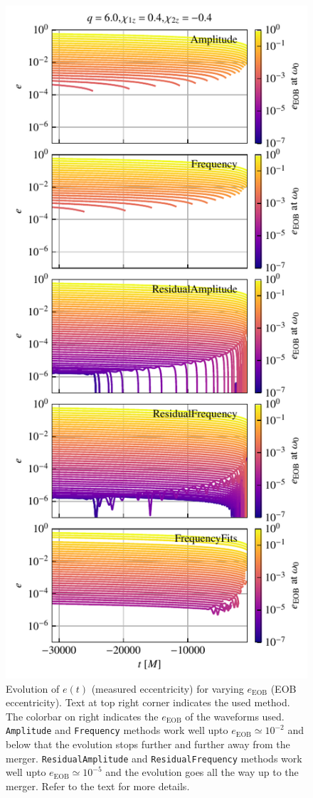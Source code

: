 \documentclass[aps,prd,amsmath,floats,floatfix, twocolumn,
superscriptaddress,nofootinbib,showpacs]{revtex4-1}
\newcommand{\eEOB}{e_{\text{EOB}}}
\newcommand{\mAmp}{\texttt{Amplitude}}
\newcommand{\mFreq}{\texttt{Frequency}}
\newcommand{\mResAmp}{\texttt{ResidualAmplitude}}
\newcommand{\mResFreq}{\texttt{ResidualFrequency}}
\begin{document}
\begin{figure}[thb]
\includegraphics[width=\columnwidth]{test_measured_ecc_vs_time_example}
\caption{
  Evolution of $e(t)$ (measured eccentricity) for varying $\eEOB$ (EOB
eccentricity). Text at top right corner indicates the used method. The
colorbar on right indicates the $\eEOB$ of the waveforms
used. \mAmp{} and \mFreq{} methods work well upto
$\eEOB \simeq 10^{-2}$ and below that the evolution stops further and
further away from the merger. \mResAmp{} and
\mResFreq{} methods work well upto $\eEOB \simeq
10^{-5}$ and the evolution goes all the way up to the merger. Refer to
the text for more details.
}
\label{fig:measured_ecc_vs_time}
\end{figure}
\end{document}
